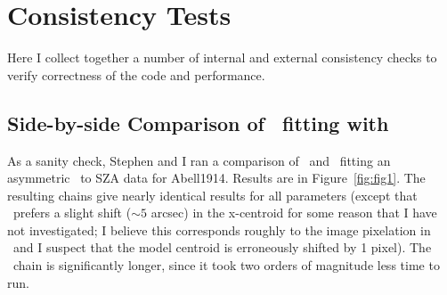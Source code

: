 \section{Consistency Tests}

Here I collect together a number of internal and external consistency
checks to verify correctness of the code and performance.

\subsection{Side-by-side Comparison of \betamodel\ fitting with \markov}

As a sanity check, Stephen and I ran a comparison of \climax\ and
\markov\, fitting an asymmetric \betamodel\ to SZA data for Abell1914.
Results are in Figure~\ref{fig:fig1}.  The resulting chains give
nearly identical results for all parameters (except that
\markov\ prefers a slight shift ($\sim 5$ arcsec) in the x-centroid
for some reason that I have not investigated; I believe this
corresponds roughly to the image pixelation in \markov\ and I suspect
that the model centroid is erroneously shifted by 1 pixel).  The
\climax\ chain is significantly longer, since it took two orders of
magnitude less time to run.

